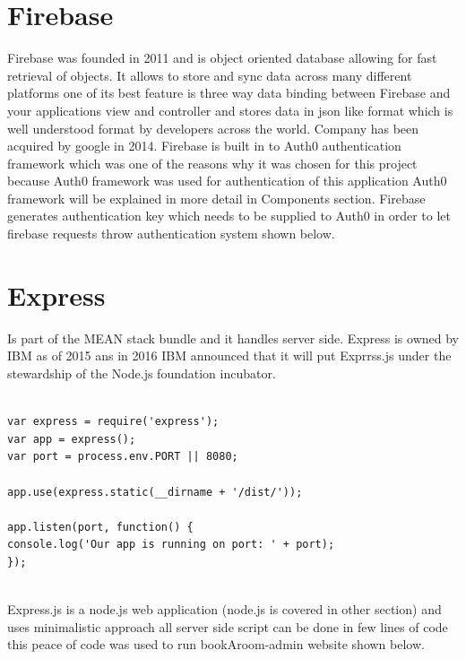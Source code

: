 \begin{itemize}
\section{Firebase}
Firebase was founded in 2011 and is object oriented database allowing for fast retrieval of objects. It allows to store and sync data across many different platforms one of its best feature is three way data binding between Firebase and your applications view and controller and stores data in json like format which is well understood format by developers across the world. Company has been acquired by google in 2014. Firebase is built in to Auth0 authentication framework which was one of the reasons why it was chosen for this project because Auth0 framework was used for authentication of this application Auth0 framework will be explained in more detail in Components section. Firebase generates authentication key which needs to be supplied to Auth0 in order to let firebase requests throw authentication system shown below.

\section{Express}
Is part of the MEAN stack bundle and it handles server side. Express is owned by IBM as of 2015 ans in 2016 IBM announced that it will put Exprrss.js under the stewardship of the Node.js foundation incubator.
\begin{verbatim}

var express = require('express');
var app = express();
var port = process.env.PORT || 8080;

app.use(express.static(__dirname + '/dist/'));

app.listen(port, function() {
console.log('Our app is running on port: ' + port);
});


\end{verbatim}

Express.js is a node.js web application (node.js is covered in other section) and uses minimalistic approach all server side script can be done in few lines of code this peace of code was used to run bookAroom-admin website shown below.



\end{itemize}
